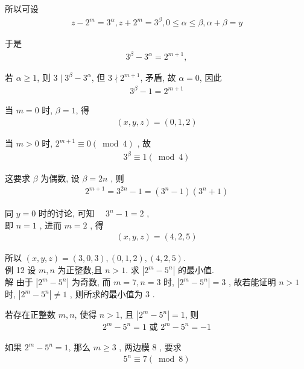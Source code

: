 	所以可设
\begin{align*}
		z-2^{m}=3^{\alpha}, z+2^{m}=3^{\beta}, 0 \leqslant \alpha \leqslant \beta, \alpha+\beta=y
	\end{align*}

	于是
\begin{align*}
		3^{\beta}-3^{\alpha}=2^{m+1},
	\end{align*}

	若 $\alpha \geqslant 1$, 则 $3 \mid 3^{\beta}-3^{\alpha}$, 但 $3 \nmid 2^{m+1}$, 矛盾, 故 $\alpha=0$, 因此
\begin{align*}
		3^{\beta}-1=2^{m+1}
	\end{align*}

	当 $m=0$ 时, $\beta=1$, 得
\begin{align*}
		(x, y, z)=(0,1,2)
	\end{align*}

	当 $m>0$ 时, $2^{m+1} \equiv 0(\bmod 4)$ , 故
\begin{align*}
		3^{\beta} \equiv 1(\bmod 4)
	\end{align*}

	这要求 $\beta$ 为偶数, 设 $\beta=2 n$ , 则
\begin{align*}
		2^{m+1}=3^{2 n}-1=\left(3^{n}-1\right)\left(3^{n}+1\right)
	\end{align*}

	同 $y=0$ 时的讨论, 可知 $\quad 3^{n}-1=2$ , \\
	即 $n=1$ , 进而 $m=2$ , 得
\begin{align*}
		(x, y, z)=(4,2,5)
	\end{align*}

	所以 $(x, y, z)=(3,0,3),(0,1,2),(4,2,5)$.\\
	例 12 设 $m ,  n$ 为正整数,且 $n>1$. 求 $\left|2^{m}-5^{n}\right|$ 的最小值.\\
	解 由于 $\left|2^{m}-5^{n}\right|$ 为奇数, 而 $m=7, n=3$ 时,  $\left|2^{m}-5^{n}\right|=3$ , 故若能证明 $n>1$ 时,  $\left|2^{m}-5^{n}\right| \neq 1$ , 则所求的最小值为 3 .

	若存在正整数 $m ,  n$, 使得 $n>1$, 且 $\left|2^{m}-5^{n}\right|=1$, 则
\begin{align*}
		2^{m}-5^{n}=1 \text { 或 } 2^{m}-5^{n}=-1
	\end{align*}

	如果 $2^{m}-5^{n}=1$, 那么 $m \geqslant 3$ , 两边模 8 , 要求
\begin{align*}
		5^{n} \equiv 7(\bmod 8)
	\end{align*}

